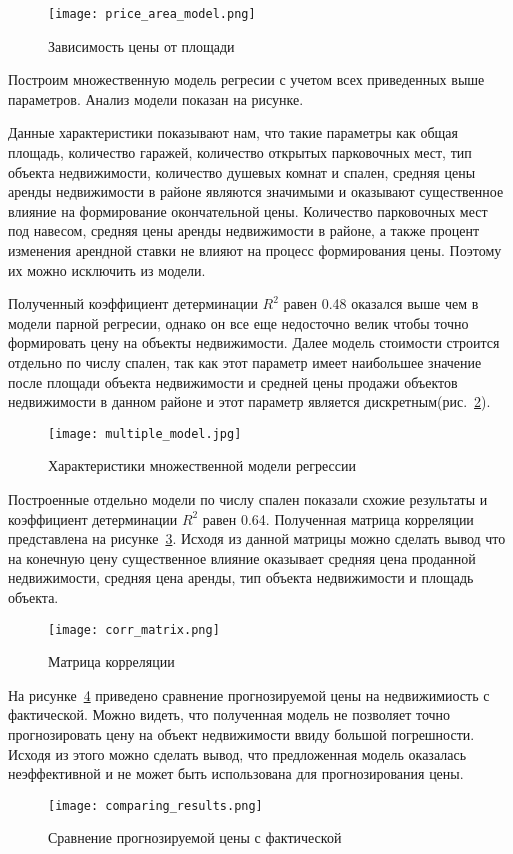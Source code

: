 \begin{figure}[!ht]
  \centering
  \texttt{[image: price\_area\_model.png]} 
  \caption{Зависимость цены от площади}
  \label{fig:experiment:price_area_model}
\end{figure}

Построим множественную модель регресии с учетом всех приведенных выше параметров. Анализ модели показан на
рисунке.

Данные характеристики показывают нам, что такие параметры как 
общая площадь, количество гаражей, количество открытых парковочных мест, тип объекта недвижимости, количество душевых комнат и спален,
средняя цены аренды недвижимости в районе являются значимыми и оказывают существенное влияние на формирование
окончательной цены. Количество парковочных мест под навесом, средняя цены аренды недвижимости в районе,
а также процент изменения арендной ставки не влияют на процесс формирования цены. Поэтому их можно исключить из модели.

Полученный коэффициент детерминации $R^2$ равен 0.48 оказался выше чем в модели парной регресии, однако он все еще
недосточно велик чтобы точно формировать цену на объекты недвижимости. Далее модель стоимости строится
отдельно по числу спален, так как этот параметр имеет наибольшее значение после площади объекта недвижимости
и средней цены продажи объектов недвижимости в данном районе и этот параметр
является дискретным(рис.~\ref{fig:experiment:multiple_model}).

\begin{figure}[!ht]
  \centering
  \texttt{[image: multiple\_model.jpg]}
  \caption{Характеристики множественной модели регрессии}
  \label{fig:experiment:multiple_model}
\end{figure}

Построенные отдельно модели по числу спален показали схожие результаты и коэффициент детерминации $R^2$ равен 0.64.
Полученная матрица корреляции представлена на рисунке~\ref{fig:experiment:corr_matrix}. Исходя из данной матрицы можно 
сделать вывод что на конечную цену существенное влияние оказывает средняя цена проданной недвижимости, средняя цена аренды,
тип объекта недвижимости и площадь объекта.

\begin{figure}[!ht]
  \centering
  \texttt{[image: corr\_matrix.png]}
  \caption{Матрица корреляции}
  \label{fig:experiment:corr_matrix}
\end{figure}

На рисунке~\ref{fig:experiment:comparing_results} приведено сравнение прогнозируемой цены на недвижимиость
с фактической. Можно видеть, что полученная модель не позволяет точно прогнозировать цену на объект недвижимости ввиду
большой погрешности. Исходя из этого можно сделать вывод, что предложенная модель оказалась неэффективной и не может быть
использована для прогнозирования цены.

\begin{figure}[!ht]
  \centering
  \texttt{[image: comparing\_results.png]}
  \caption{Сравнение прогнозируемой цены с фактической}
  \label{fig:experiment:comparing_results}
\end{figure}
